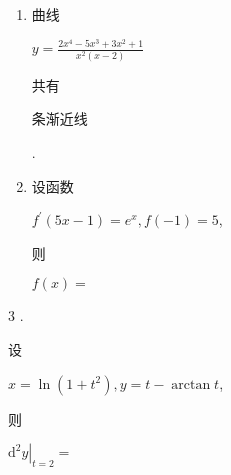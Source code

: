 \documentclass[10pt]{article}
\begin{document}
\begin{enumerate}
  \item \begin{CJK}{UTF8}{mj}曲线\end{CJK} $y=\frac{2 x^{4}-5 x^{3}+3 x^{2}+1}{x^{2}(x-2)}$ \begin{CJK}{UTF8}{mj}共有\end{CJK} \begin{CJK}{UTF8}{mj}条渐近线\end{CJK}.

  \item \begin{CJK}{UTF8}{mj}设函数\end{CJK} $f^{\prime}(5 x-1)=e^{x}, f(-1)=5$, \begin{CJK}{UTF8}{mj}则\end{CJK} $f(x)=$

\end{enumerate}
3 . \begin{CJK}{UTF8}{mj}设\end{CJK} $x=\ln \left(1+t^{2}\right), y=t-\arctan t$, \begin{CJK}{UTF8}{mj}则\end{CJK} $\left.\mathrm{d}^{2} y\right|_{t=2}=$
\end{document}
